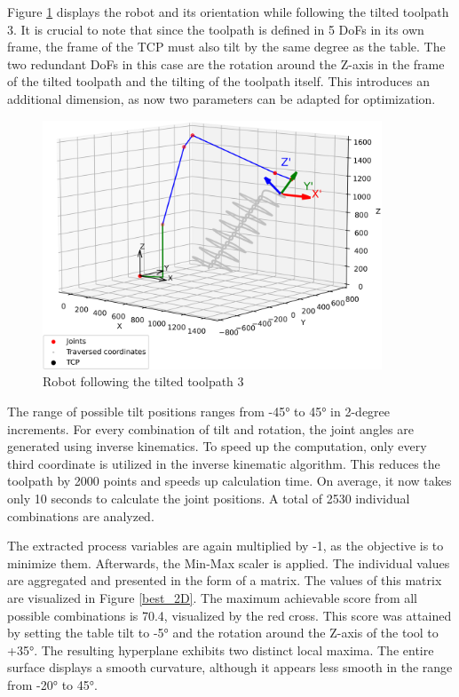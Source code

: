 Figure \ref{TP3_25_robot} displays the robot and its orientation while following the tilted toolpath 3. It is crucial to note that since the toolpath is defined in 5 \acrshort{DoF}s in its own frame, the frame of the \acrshort{TCP} must also tilt by the same degree as the table. The two redundant \acrshort{DoF}s in this case are the rotation around the Z-axis in the frame of the tilted toolpath and the tilting of the toolpath itself. This introduces an additional dimension, as now two parameters can be adapted for optimization.


\begin{figure}[H]
	\centerline{\includegraphics[width=0.9\textwidth]{figures/robotANDpath3_45.png}}
	\caption{Robot following the tilted toolpath 3}
	\label{TP3_25_robot}
\end{figure}

The range of possible tilt positions ranges from -45° to 45° in 2-degree increments. For every combination of tilt and rotation, the joint angles are generated using inverse kinematics. To speed up the computation, only every third coordinate is utilized in the inverse kinematic algorithm. This reduces the toolpath by 2000 points and speeds up calculation time. On average, it now takes only 10 seconds to calculate the joint positions. A total of 2530 individual combinations are analyzed.

The extracted process variables are again multiplied by -1, as the objective is to minimize them. Afterwards, the Min-Max scaler is applied. The individual values are aggregated and presented in the form of a matrix. The values of this matrix are visualized in Figure \ref{best_2D}. The maximum achievable score from all possible combinations is 70.4, visualized by the red cross. This score was attained by setting the table tilt to -5° and the rotation around the Z-axis of the tool to +35°. The resulting hyperplane exhibits two distinct local maxima. The entire surface displays a smooth curvature, although it appears less smooth in the range from -20° to 45°.


